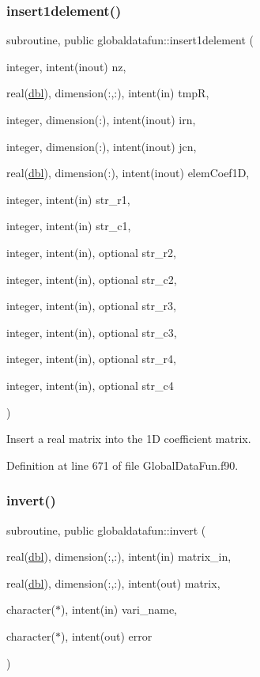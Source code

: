 \subsubsection{\texorpdfstring{insert1delement()}{insert1delement()}}
{\footnotesize\ttfamily subroutine, public globaldatafun\+::insert1delement (\begin{DoxyParamCaption}\item[{integer, intent(inout)}]{nz,  }\item[{real(\hyperlink{namespaceglobaldatafun_a5008801201dd34f2af8eae07756befb4}{dbl}), dimension(\+:,\+:), intent(in)}]{tmpR,  }\item[{integer, dimension(\+:), intent(inout)}]{irn,  }\item[{integer, dimension(\+:), intent(inout)}]{jcn,  }\item[{real(\hyperlink{namespaceglobaldatafun_a5008801201dd34f2af8eae07756befb4}{dbl}), dimension(\+:), intent(inout)}]{elem\+Coef1D,  }\item[{integer, intent(in)}]{str\+\_\+r1,  }\item[{integer, intent(in)}]{str\+\_\+c1,  }\item[{integer, intent(in), optional}]{str\+\_\+r2,  }\item[{integer, intent(in), optional}]{str\+\_\+c2,  }\item[{integer, intent(in), optional}]{str\+\_\+r3,  }\item[{integer, intent(in), optional}]{str\+\_\+c3,  }\item[{integer, intent(in), optional}]{str\+\_\+r4,  }\item[{integer, intent(in), optional}]{str\+\_\+c4 }\end{DoxyParamCaption})}



Insert a real matrix into the 1D coefficient matrix. 



Definition at line 671 of file Global\+Data\+Fun.\+f90.

\mbox{\label{namespaceglobaldatafun_a1e393f2df119550fc86d1c0864fde446}} 
\subsubsection{\texorpdfstring{invert()}{invert()}}
{\footnotesize\ttfamily subroutine, public globaldatafun\+::invert (\begin{DoxyParamCaption}\item[{real(\hyperlink{namespaceglobaldatafun_a5008801201dd34f2af8eae07756befb4}{dbl}), dimension(\+:,\+:), intent(in)}]{matrix\+\_\+in,  }\item[{real(\hyperlink{namespaceglobaldatafun_a5008801201dd34f2af8eae07756befb4}{dbl}), dimension(\+:,\+:), intent(out)}]{matrix,  }\item[{character($\ast$), intent(in)}]{vari\+\_\+name,  }\item[{character($\ast$), intent(out)}]{error }\end{DoxyParamCaption})}



